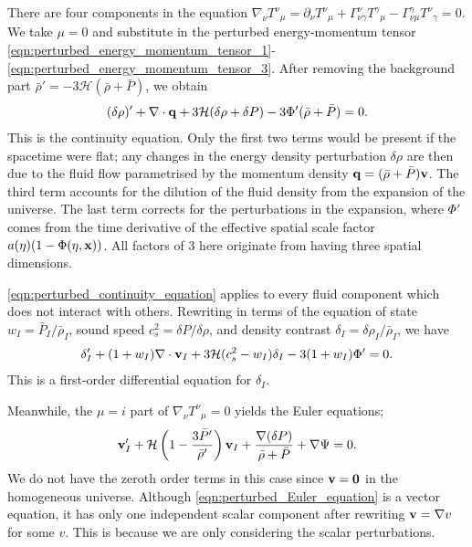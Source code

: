 There are four components in the equation $\nabla_\nu {T^\nu}_\mu = \partial_\nu {T^\nu}_\mu + \Gamma^\nu_{\nu\gamma} {T^\gamma}_\mu - \Gamma^\gamma_{\nu\mu} {T^\nu}_\gamma=0$. We take $\mu=0$ and substitute in the perturbed energy-momentum tensor \eqref{eqn:perturbed_energy_momentum_tensor_1}-\eqref{eqn:perturbed_energy_momentum_tensor_3}. After removing the background part $\bar{\rho}'=-3\mathcal{H}(\bar{\rho}+\bar{P})$, we obtain
\begin{align}
	(\delta\rho)' + \nabla \cdot \mathbf{q}+ 3 \mathcal{H} (\delta\rho + \delta P) - 3 \Phi' (\bar{\rho} + \bar{P})  = 0.  \label{eqn:perturbed_continuity_equation}
\end{align}
This is the continuity equation. Only the first two terms would be present if the spacetime were flat; any changes in the energy density perturbation $\delta\rho$ are then due to the fluid flow parametrised by the momentum density $\mathbf{q} = (\bar{\rho}+\bar{P})\mathbf{v}$. The third term accounts for the dilution of the fluid density from the expansion of the universe. The last term corrects for the perturbations in the expansion, where $\Phi'$ comes from the time derivative of the effective spatial scale factor $a(\eta)(1-\Phi(\eta,\mathbf{x}))$. All factors of 3 here originate from having three spatial dimensions.

\eqref{eqn:perturbed_continuity_equation} applies to every fluid component which does not interact with others. Rewriting in terms of the equation of state $w_I = \bar{P}_I / \bar{\rho}_I$, sound speed $c_s^2 = \delta P / \delta\rho$, and density contrast $\delta_I = \delta\rho_I / \bar{\rho}_I$, we have
\begin{align}
	\delta'_I + (1+w_I) \nabla\cdot\mathbf{v}_I + 3\mathcal{H}(c_s^2-w_I)\delta_I - 3(1+w_I) \Phi' = 0.
\end{align}
This is a first-order differential equation for $\delta_I$.

Meanwhile, the $\mu=i$ part of $\nabla_\nu {T^\nu}_\mu =0$ yields the Euler equations;
\begin{align}
	\mathbf{v}'_I + \mathcal{H} \left( 1 - \frac{3\bar{P}'}{\bar{\rho}'} \right) \mathbf{v}_I + \frac{\nabla(\delta P)}{\bar{\rho} + \bar{P}} + \nabla\Psi = 0. \label{eqn:perturbed_Euler_equation}
\end{align}
We do not have the zeroth order terms in this case since $\mathbf{v}=\mathbf{0}$ in the homogeneous universe. Although \eqref{eqn:perturbed_Euler_equation} is a vector equation, it has only one independent scalar component after rewriting $\mathbf{v}=\nabla v$ for some $v$. This is because we are only considering the scalar perturbations.

